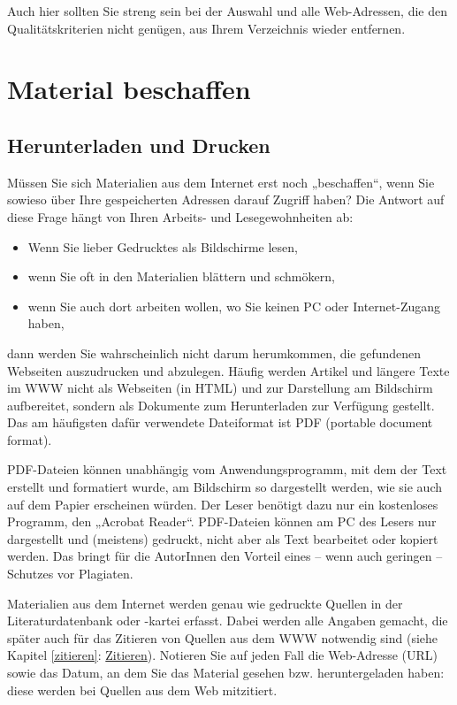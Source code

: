 \documentclass[]{book}
\providecommand{\tightlist}{%
  \setlength{\itemsep}{0pt}\setlength{\parskip}{0pt}}
\theoremstyle{definition}
\theoremstyle{definition}
\theoremstyle{definition}
\theoremstyle{remark}
\begin{document}
Auch hier sollten Sie streng sein bei der Auswahl und alle Web-Adressen,
die den Qualitätskriterien nicht genügen, aus Ihrem Verzeichnis wieder
entfernen.

\section{Material beschaffen}\label{material-beschaffen}

\subsection{Herunterladen und Drucken}\label{herunterladen-und-drucken}

Müssen Sie sich Materialien aus dem Internet erst noch „beschaffen``,
wenn Sie sowieso über Ihre gespeicherten Adressen darauf Zugriff haben?
Die Antwort auf diese Frage hängt von Ihren Arbeits- und
Lesegewohnheiten ab:

\begin{itemize}
\tightlist
\item
  Wenn Sie lieber Gedrucktes als Bildschirme lesen,
\item
  wenn Sie oft in den Materialien blättern und schmökern,
\item
  wenn Sie auch dort arbeiten wollen, wo Sie keinen PC oder
  Internet-Zugang haben,
\end{itemize}

dann werden Sie wahrscheinlich nicht darum herumkommen, die gefundenen
Webseiten auszudrucken und abzulegen. Häufig werden Artikel und längere
Texte im WWW nicht als Webseiten (in HTML) und zur Darstellung am
Bildschirm aufbereitet, sondern als Dokumente zum Herunterladen zur
Verfügung gestellt. Das am häufigsten dafür verwendete Dateiformat ist
PDF (portable document format).

PDF-Dateien können unabhängig vom Anwendungsprogramm, mit dem der Text
erstellt und formatiert wurde, am Bildschirm so dargestellt werden, wie
sie auch auf dem Papier erscheinen würden. Der Leser benötigt dazu nur
ein kostenloses Programm, den „Acrobat Reader``. PDF-Dateien können am
PC des Lesers nur dargestellt und (meistens) gedruckt, nicht aber als
Text bearbeitet oder kopiert werden. Das bringt für die AutorInnen den
Vorteil eines -- wenn auch geringen -- Schutzes vor Plagiaten.

Materialien aus dem Internet werden genau wie gedruckte Quellen in der
Literaturdatenbank oder -kartei erfasst. Dabei werden alle Angaben
gemacht, die später auch für das Zitieren von Quellen aus dem WWW
notwendig sind (siehe Kapitel \ref{zitieren}:
\protect\hyperlink{zitieren}{Zitieren}). Notieren Sie auf jeden Fall die
Web-Adresse (URL) sowie das Datum, an dem Sie das Material gesehen bzw.
heruntergeladen haben: diese werden bei Quellen aus dem Web mitzitiert.
\end{document}
